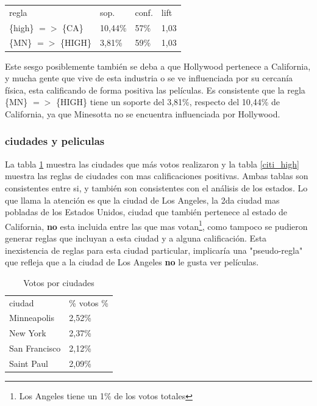 \documentclass[journal]{IEEEtran}
\begin{document}
\begin{table}[ht!]
\centering
\begin{tabular}{l l l l }
regla & sop. & conf. & lift \\
\{high\} $=$$>$ \{CA\} & 10,44\% & 57\% & 1,03 \\
\{MN\} $=$$>$ \{HIGH\} & 3,81\% & 59\% & 1,03 
\end{tabular}
\end{table}

Este sesgo posiblemente también se deba a que Hollywood pertenece a California,
y mucha gente que vive de esta industria o se ve influenciada por su cercanía
física, 
esta calificando de forma positiva las películas. Es consistente que la regla
\{MN\} $=$$>$ \{HIGH\} tiene un soporte del 3,81\%, respecto del 10,44\% de 
California, ya que Minesotta no se encuentra influenciada por Hollywood.

\subsubsection{ciudades y peliculas}
La tabla \ref{citi_votes} muestra las ciudades que más votos realizaron y
la tabla \ref{citi_high} muestra las reglas de ciudades con mas calificaciones
positivas. Ambas tablas son consistentes entre si, y también son consistentes
con el análisis de los estados. Lo que llama la atención es que la ciudad de Los
Angeles, la 2da ciudad mas  pobladas de los Estados Unidos, 
ciudad que también pertenece al estado de California, 
\textbf{no} esta incluida entre las que mas votan\footnote{Los Angeles tiene
un 1\% de los votos totales}, como tampoco se pudieron generar reglas que 
incluyan a esta ciudad y a alguna calificación. Esta inexistencia
de reglas para esta ciudad particular, implicaría una "pseudo-regla" que
refleja que a la ciudad de Los Angeles \textbf{no} le gusta ver películas.
 
\begin{table}[ht!]
\caption{Votos por ciudades}
\label{citi_votes}
\centering
\begin{tabular}{l l }
ciudad & \% votos \% \\
Minneapolis & 2,52\% \\
New York & 2,37\% \\
San Francisco & 2,12\% \\
Saint Paul & 2,09\%  \\
\end{tabular}
\end{table}
\end{document}
